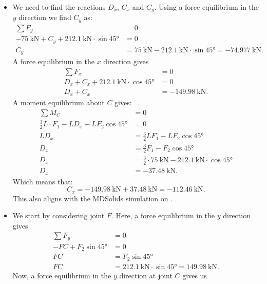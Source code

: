 \begin{derivation}
\begin{itemize}
    \item[Q1.3] We need to find the reactions $D_x$, $C_x$ and $C_y$. 
      Using a force equilibrium in the $y$ direction we find $C_y$ as:
      \begin{align*}
        \sum F_y &= 0 \\
        - \qty{75}{\kN} + C_y + \qty{212,1}{\kN} \cdot \sin \ang{45} &= 0 \\
        C_y &= \qty{75}{\kN} - \qty{212.1}{\kN} \cdot \sin \ang{45}  = \qty{-74,977}{\kN}
      .\end{align*}
      A force equilibrium in the $x$ direction gives
      \begin{align*}
        \sum F_x &= 0 \\
        D_x + C_x + \qty{212,1}{\kN} \cdot \cos \ang{45} &= 0 \\
        D_x + C_x &= - \qty{149,98}{\kN}
      .\end{align*}
      A moment equilibrium about $C$ gives:
      \begin{align*}
        \sum M_C &= 0 \\
        \frac{3}{2}L \cdot F_1 - L D_x - L F_2 \cos \ang{45} &= 0 \\
        LD_x &= \frac{3}{2}L F_1 - L F_2 \cos \ang{45} \\
        D_x &= \frac{3}{2} F_1 - F_2 \cos \ang{45}  \\
        D_x &= \frac{3}{2} \cdot \qty{75}{\kN} - \qty{212,1}{\kN} \cdot \cos \ang{45}  \\
        D_x &= \qty{-37,48}{\kN} 
      .\end{align*}
      Which means that:
      \begin{equation*}
        C_x = - \qty{149.98}{\kN} + \qty{37.48}{\kN} = \qty{-112,46}{\kN} 
      .\end{equation*}
      This also aligns with the MDSolids simulation on .
    \item[Q1.4] We start by considering joint $F$. Here, a force equilibrium in the $y$ direction gives
      \begin{align*}
        \sum F_y &= 0 \\
        - FC + F_2 \sin \ang{45} &= 0 \\
        FC &= F_2 \sin \ang{45}  \\
        FC &= \qty{212,1}{\kN} \cdot \sin \ang{45} = \qty{149,98}{\kN} 
      .\end{align*}
    Now, a force equilibrium in the $y$ direction at joint $C$ gives us
    \begin{align*}

\end{align*}
\end{itemize}
\end{derivation}
